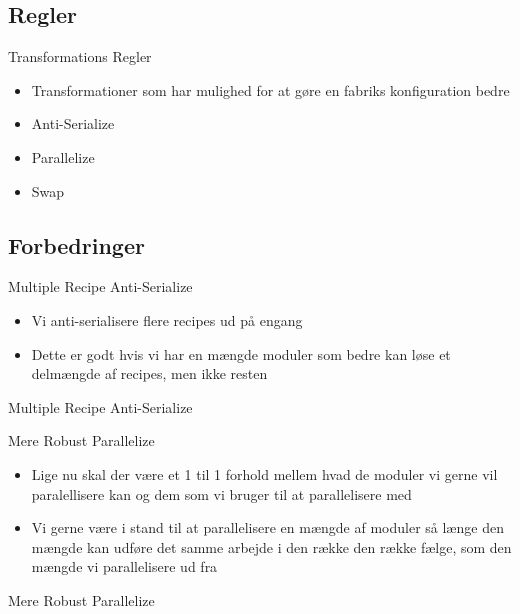 \subsection{Regler}
\begin{frame}{Transformations Regler}
	\begin{itemize}
		\item Transformationer som har mulighed for at gøre en fabriks konfiguration bedre
		\item Anti-Serialize
		\item Parallelize
		\item Swap		
	\end{itemize}
\end{frame}


\subsection{Forbedringer}
\begin{frame}{Multiple Recipe Anti-Serialize}
	\begin{itemize}
		\item Vi anti-serialisere flere recipes ud på engang
		\item Dette er godt hvis vi har en mængde moduler som bedre kan løse et delmængde af recipes, men ikke resten
	\end{itemize}
\end{frame}

\begin{frame} {Multiple Recipe Anti-Serialize}
\end{frame}

\begin{frame}{Mere Robust Parallelize}
	\begin{itemize}
		\item Lige nu skal der være et 1 til 1 forhold mellem hvad de moduler vi gerne vil paralellisere kan og dem som vi bruger til at parallelisere med
		\item Vi gerne være i stand til at parallelisere en mængde af moduler så længe den mængde kan udføre det samme arbejde i den række den række fælge, som den mængde vi parallelisere ud fra
	\end{itemize}
\end{frame}

\begin{frame} {Mere Robust Parallelize}
\end{frame}

